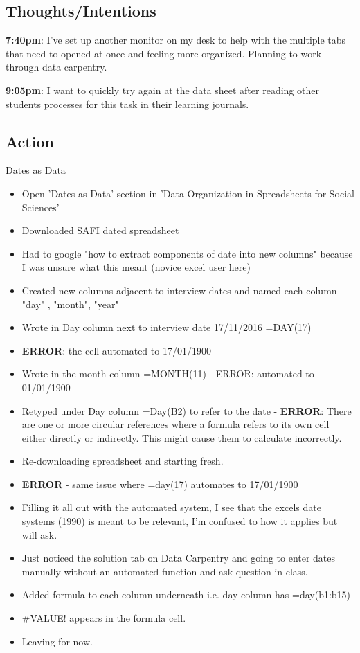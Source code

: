 \documentclass{article}
\begin{document}
\subsection{Thoughts/Intentions}
\textbf{7:40pm}:  I've set up another monitor on my desk to help with the multiple tabs that need to opened at once and feeling more organized. Planning to work through data carpentry.

\textbf{9:05pm}: I want to quickly try again at the data sheet after reading other students processes for this task in their learning journals. 

\subsection{Action}

Dates as Data 
\begin{itemize}
\item Open 'Dates as Data' section in 'Data Organization in Spreadsheets for Social Sciences'
\item Downloaded SAFI dated spreadsheet
\item Had to google "how to extract components of date into new columns" because I was unsure what this meant (novice excel user here)
\item Created new columns adjacent to interview dates and named each column "day" , "month", "year" 
\item Wrote in Day column next to interview date 17/11/2016 =DAY(17) 
\item \textbf{ERROR}: the cell automated to 17/01/1900
\item Wrote in the month column =MONTH(11) - ERROR: automated to 01/01/1900
\item Retyped under Day column =Day(B2) to refer to the date - \textbf{ERROR}: There are one or more circular references where a formula refers to its own cell either directly or indirectly. This might cause them to calculate incorrectly.
\item Re-downloading spreadsheet and starting fresh.
\item \textbf{ERROR} - same issue where =day(17) automates to 17/01/1900
\item Filling it all out with the automated system, I see that the excels date systems (1990) is meant to be relevant, I'm confused to how it applies but will ask.
\item Just noticed the solution tab on Data Carpentry and going to enter dates manually without an automated function and ask question in class.
\item Added formula to each column underneath i.e. day column has =day(b1:b15)
\item #VALUE! appears in the formula cell. 
\item Leaving for now.
\end{itemize}
\end{document}
